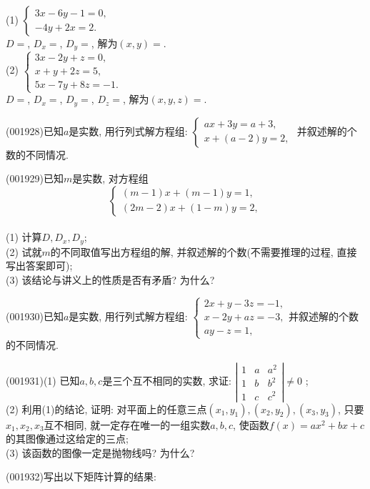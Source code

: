 (1) $\left\{\begin{array}{l}3x-6y-1=0,\\-4y+2x=2.\end{array}\right.$ \\ 
$D=$, $D_x=$, $D_y=$, 解为$(x,y)=$.\\ 
(2) $\left\{\begin{array}{l}3x-2y+z=0,\\x+y+2z=5,\\5x-7y+8z=-1.\end{array}\right.$ \\ 
$D=$, $D_x=$, $D_y=$, $D_z=$, 解为$(x,y,z)=$.
\item (001928)已知$a$是实数, 用行列式解方程组: $\left\{\begin{array}{l}ax+3y=a+3,\\x+(a-2)y=2,\end{array}\right.$ 并叙述解的个数的不同情况.
\item (001929)已知$m$是实数, 对方程组
$$\left\{\begin{array}{l}(m-1)x+(m-1)y=1,\\(2m-2)x+(1-m)y=2,\end{array}\right.$$\\ 
(1) 计算$D,D_x,D_y$;\\ 
(2) 试就$m$的不同取值写出方程组的解, 并叙述解的个数(不需要推理的过程, 直接写出答案即可);\\ 
(3) 该结论与讲义上的性质是否有矛盾? 为什么?
\item (001930)已知$a$是实数, 用行列式解方程组: $\left\{\begin{array}{l}2x+y-3z=-1,\\x-2y+az=-3,\\ay-z=1,\end{array}\right.$并叙述解的个数的不同情况.
\item (001931)(1) 已知$a,b,c$是三个互不相同的实数, 求证:
$\left|\begin{array}{ccc}1&a&a^2\\1&b&b^2\\1&c&c^2 \end{array}\right|\neq 0$
;\\ 
(2) 利用(1)的结论, 证明: 对平面上的任意三点$(x_1,y_1),(x_2,y_2),(x_3,y_3)$, 只要$x_1,x_2,x_3$互不相同, 就一定存在唯一的一组实数$a,b,c$, 使函数$f(x)=ax^2+bx+c$的其图像通过这给定的三点;\\ 
(3) 该函数的图像一定是抛物线吗? 为什么?
\item (001932)写出以下矩阵计算的结果:\\ 
